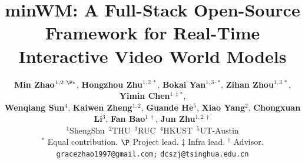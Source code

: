 \documentclass[10pt, logo, onecolumn]{shengshu}
\title{minWM: A Full-Stack Open-Source Framework for Real-Time Interactive Video World Models}
\author{%
  \textbf{Min Zhao}$^{1,2~\P*}$, 
    \textbf{Hongzhou Zhu}$^{1,2~*}$,
    \textbf{Bokai Yan}$^{1,3·*}$, \textbf{Zihan Zhou}$^{1,3~*}$,
    \textbf{Yimin Chen}$^{1~\ddagger*}$,\\
    \textbf{Wenqiang Sun}$^{4}$, 
    \textbf{Kaiwen Zheng}$^{1,2}$,
    \textbf{Guande He}$^{5}$,
    \textbf{Xiao Yang}$^{2}$, 
  \textbf{Chongxuan Li}$^{3}$, \textbf{Fan Bao}$^{1~\dagger}$, \textbf{Jun Zhu}$^{1,2~\dagger}$\\
  $^1$ShengShu\,
  $^2$THU\,
  $^3$RUC\,
  $^4$HKUST\,
  $^5$UT-Austin\\
  {\small $^*$ Equal contribution. \quad $\P$ Project lead. \quad $\ddagger$ Infra lead. \quad $^\dagger$ Advisor.}\\
\texttt{gracezhao1997@gmail.com;}
\texttt{dcszj@tsinghua.edu.cn}
}
\begin{document}
\maketitle


% 




\clearpage

{
  \small
  
  
}
\end{document}
